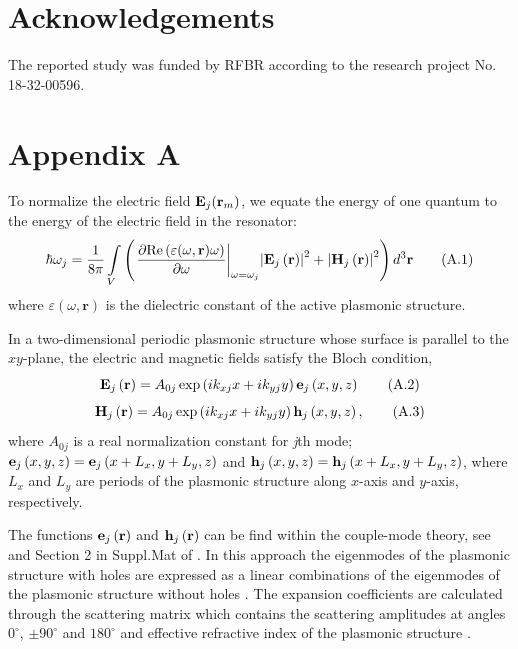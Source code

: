 \documentclass[aps,pra,amsmath,amssymb,onecolumn,superscriptaddress,showpacs,floatfix,]{revtex4-1}
\begin{document}
\section*{Acknowledgements}

The reported study was funded by RFBR according to the research project No. 18-32-00596.

\section*{Appendix A}
To normalize the electric field ${{\bf{E}}_j}({{\bf{r}}_m})$, we equate the energy of one quantum to the energy of the electric field in the resonator:
\begin{equation}
\hbar {\omega _j} = \frac{1}{{8\pi }}\int\limits_V {\left( {{{\left. {\frac{{\partial {\mathop{\rm Re}\nolimits} \left( {\varepsilon(\omega, \textbf{r}) \omega } \right)}}{{\partial \omega }}} \right|}_{\omega  = {\omega _j}}}{{\left| {{{\bf{E}}_j}\left( {\bf{r}} \right)} \right|}^2} + {{\left| {{{\bf{H}}_j}\left( {\bf{r}} \right)} \right|}^2}} \right){d^3}{\bf{r}}} \tag{A.1}
\end{equation}
where $\varepsilon (\omega, \textbf{r})$  is the dielectric constant of the active plasmonic structure.

In a two-dimensional periodic plasmonic structure whose surface is parallel to the $xy$-plane, the electric and magnetic fields satisfy the Bloch condition,
\begin{equation}
{{\bf{E}}_j}\left( {\bf{r}} \right) = {A_{0j}}\exp \left( {i{k_{xj}}x + i{k_{yj}}y} \right){{\bf{e}}_j}\left( {x,y,z} \right) \tag{A.2}
\end{equation}
\begin{equation}
{{\bf{H}}_j}\left( {\bf{r}} \right) = {A_{0j}}\exp \left( {i{k_{xj}}x + i{k_{yj}}y} \right){{\bf{h}}_j}\left( {x,y,z} \right), \tag{A.3}
\end{equation}
where $A_{0j}$ is a real normalization constant for \textit{j}th mode; ${{\bf{e}}_j}\left( {x,y,z} \right) = {{\bf{e}}_j}\left( {x + {L_x},y + {L_y},z} \right)$  and ${{\bf{h}}_j}\left( {x,y,z} \right) = {{\bf{h}}_j}\left( {x + {L_x},y + {L_y},z} \right)$, where $L_x$ and $L_y$ are periods of the plasmonic structure along $x$-axis and $y$-axis, respectively.

The functions ${{\bf{e}}_j}\left(\textbf{r}\right)$ and ${{\bf{h}}_j}\left(\textbf{r}\right)$ can be find within the couple-mode theory, see \cite{TennerJOpt,TennerACSPhot} and Section 2 in Suppl.Mat of \cite{nefedkin2018acsphot}. In this approach the eigenmodes of the plasmonic structure with holes are expressed as a linear combinations of the eigenmodes of the plasmonic structure without holes \cite{TennerJOpt,TennerACSPhot}. The expansion coefficients are calculated through the scattering matrix which contains the scattering amplitudes at angles $0^{\circ }$, $\pm 90^{\circ }$ and $180^{\circ }$ and effective refractive index of the plasmonic structure \cite{TennerJOpt,TennerACSPhot}.
\end{document}
